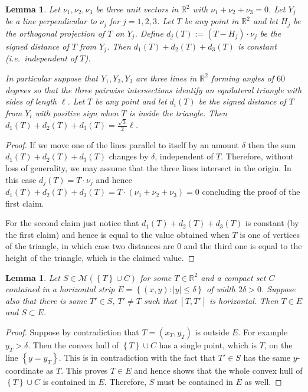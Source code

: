 \documentclass{amsart}
\newcommand{\RR}{\mathbb R}
\newcommand{\abs}[1]{\left\vert #1 \right\vert}
\newcommand{\ENCLOSE}[1]{\left\{#1\right\}}
\newcommand{\M}{\mathcal{M}}
\newtheorem{lemma}[theorem]{Lemma}
\theoremstyle{definition}
\theoremstyle{remark}
\begin{document}
  \begin{lemma}\label{lm:tripod}
    Let $\nu_1,\nu_2,\nu_3$ be three unit vectors in $\RR^2$
    with $\nu_1+\nu_2+\nu_3=0$. 
    Let $Y_j$ be a line perpendicular to $\nu_j$ for $j=1,2,3$.
    Let $T$ be any point in $\RR^2$ and let $H_j$ be the orthogonal 
    projection of $T$ on $Y_j$.
    Define $d_j(T) := (T-H_j)\cdot \nu_j$
    be the signed distance of $T$ from $Y_j$.
    Then $d_1(T) + d_2(T) + d_3(T)$ is constant 
    (i.e.\ independent of $T$).
  
    In particular suppose that  
    $Y_1,Y_2,Y_3$ are three lines in $\RR^2$
    forming angles of $60$ degrees so that 
    the three pairwise intersections identify
    an equilateral triangle with sides of length $\ell$.
    Let $T$ be any point and let $d_i(T)$ be 
    the signed distance of $T$ from $Y_i$
    with positive sign when $T$ is inside the triangle.
    Then $d_1(T) + d_2(T) + d_3(T) = \frac{\sqrt 3}{2}\ell$.
  \end{lemma}
  \begin{proof}
    If we move one of the lines parallel to itself by an amount $\delta$ 
    then the sum $d_1(T)+d_2(T)+d_3(T)$ changes by $\delta$, independent 
    of $T$.
    Therefore, without loss of generality, we may assume that the three lines 
    intersect in the origin.
    In this case $d_j(T) = T\cdot \nu_j$ and hence 
    $d_1(T)+d_2(T)+d_3(T) = T\cdot (\nu_1+\nu_2+\nu_3) = 0$
    concluding the proof of the first claim.
  
    For the second claim just notice that $d_1(T)+d_2(T)+d_3(T)$
    is constant (by the first claim) and hence is equal to the value 
    obtained when $T$ is one of vertices of the triangle, in which case 
    two distances are $0$ and the third one is equal to the height of the
    triangle, which is the claimed value.
  \end{proof}
  
\begin{lemma}\label{lm:envelope}
Let $S\in \M(\ENCLOSE{T}\cup C)$
for some $T\in \RR^2$ and a compact set $C$ contained in a horizontal strip 
$E=\ENCLOSE{(x,y)\colon \abs{y}\le \delta}$ of width $2\delta>0$.
Suppose also that there is some $T'\in S$, $T'\neq T$ 
such that $[T,T']$ is horizontal.
Then $T\in E$ and $S\subset E$.
\end{lemma}
%
\begin{proof}
  Suppose by contradiction that $T=(x_T,y_T)$ is outside $E$.
  For example $y_T>\delta$. 
  Then the convex hull of $\ENCLOSE{T}\cup C$ has a single 
  point, which is $T$, on the line $\ENCLOSE{y=y_T}$. 
  This is in contradiction with the fact that $T'\in S$ 
  has the same $y$-coordinate as $T$.
  This proves $T\in E$ and hence
  shows that the whole convex hull of 
  $\ENCLOSE{T}\cup C$ is contained in $E$. 
  Therefore, $S$ must be contained in $E$ as well.
\end{proof}
\end{document}
